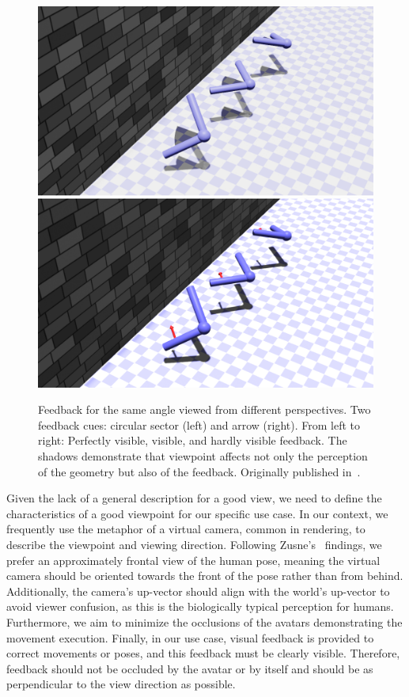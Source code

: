 \begin{figure}[h]
	\centering
	\includegraphics[width=0.49\linewidth]{pictures/projection_feedback}\hfill
	\includegraphics[width=0.49\linewidth]{pictures/projection_feedback_arrow}
	\caption{Feedback for the same angle viewed from different perspectives. Two feedback cues: circular sector (left) and arrow (right). From left to right: Perfectly visible, visible, and hardly visible feedback. The shadows demonstrate that viewpoint affects not only the perception of the geometry but also of the feedback. Originally published in~\cite{diller2024automatic}.}
	\label{fig:projection_feedback}
\end{figure}

Given the lack of a general description for a good view, we need to define the characteristics of a good viewpoint for our specific use case. In our context, we frequently use the metaphor of a virtual camera, common in rendering, to describe the viewpoint and viewing direction. Following Zusne's~\cite{zusne1970vpf} findings, we prefer an approximately frontal view of the human pose, meaning the virtual camera should be oriented towards the front of the pose rather than from behind. Additionally, the camera's up-vector should align with the world's up-vector to avoid viewer confusion, as this is the biologically typical perception for humans. Furthermore, we aim to minimize the occlusions of the avatars demonstrating the movement execution. Finally, in our use case, visual feedback is provided to correct movements or poses, and this feedback must be clearly visible. Therefore, feedback should not be occluded by the avatar or by itself and should be as perpendicular to the view direction as possible.

